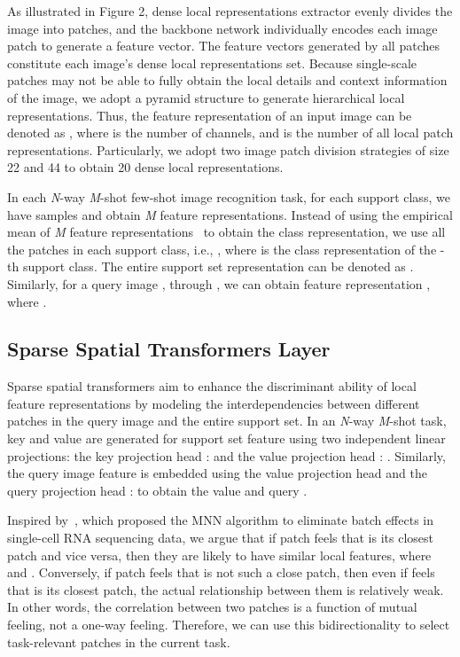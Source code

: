 \documentclass{SCIS2019}
\begin{document}
As illustrated in Figure 2, dense local representations extractor  evenly divides the image into  patches, and the backbone network individually encodes each image patch to generate a feature vector. The feature vectors generated by all patches constitute each image's dense local representations set. Because single-scale patches may not be able to fully obtain the local details and context information of the image, we adopt a pyramid structure to generate hierarchical local representations. Thus, the feature representation of an input image  can be denoted as , where  is the number of channels, and  is the number of all local patch representations. Particularly, we adopt two image patch division strategies of size 22 and 44 to obtain 20 dense local representations.

In each \emph{N}-way \emph{M}-shot few-shot image recognition task, for each support class, we have  samples and obtain \emph{M} feature representations. Instead of using the empirical mean of \emph{M} feature representations~\cite{7} to obtain the class representation, we use all the patches in each support class, i.e., ,
where  is the class representation of the -th support class. The entire support set representation can be denoted as . Similarly, for a query image , through , we can obtain feature representation , where .

\subsection{Sparse Spatial Transformers Layer}
Sparse spatial transformers aim to enhance the discriminant ability of local feature representations by modeling the interdependencies between different patches in the query image and the entire support set. In an \emph{N}-way \emph{M}-shot task, key  and value  are generated for support set feature  using two independent linear projections: the key projection head :  and the value projection head : . Similarly, the query image feature  is embedded using the value projection head  and the query projection head :  to obtain the value  and query .

Inspired by~\cite{17}, which proposed the MNN algorithm to eliminate batch effects in single-cell RNA sequencing data, we argue that if patch  feels that  is its closest patch and vice versa, then they are likely to have similar local features, where  and . Conversely, if patch  feels that  is not such a close patch, then even if  feels that  is its closest patch, the actual relationship between them is relatively weak. In other words, the correlation between two patches is a function of mutual feeling, not a one-way feeling. Therefore, we can use this bidirectionality to select task-relevant patches in the current task.
\end{document}
